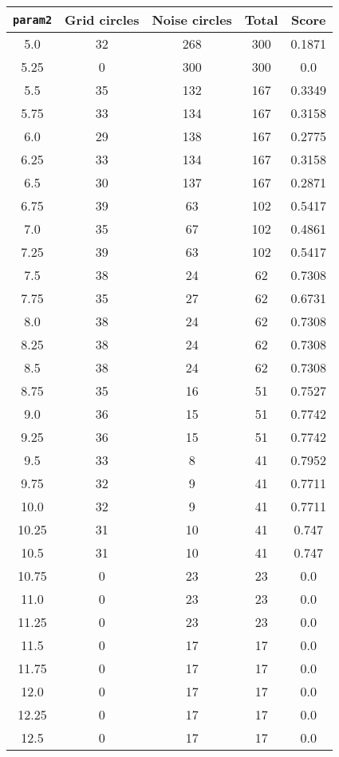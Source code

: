 \documentclass[letterpaper, 12pt]{article}
\begin{document}
\begin{longtable}{|c|c|c|c|c|}
\hline
\textbf{\texttt{param2}} & \textbf{Grid circles} & \textbf{Noise circles} & \textbf{Total} & \textbf{Score} \\
\hline
5.0 & 32 & 268 & 300 & 0.1871 \\
\hline
5.25 & 0 & 300 & 300 & 0.0 \\
\hline
5.5 & 35 & 132 & 167 & 0.3349 \\
\hline
5.75 & 33 & 134 & 167 & 0.3158 \\
\hline
6.0 & 29 & 138 & 167 & 0.2775 \\
\hline
6.25 & 33 & 134 & 167 & 0.3158 \\
\hline
6.5 & 30 & 137 & 167 & 0.2871 \\
\hline
6.75 & 39 & 63 & 102 & 0.5417 \\
\hline
7.0 & 35 & 67 & 102 & 0.4861 \\
\hline
7.25 & 39 & 63 & 102 & 0.5417 \\
\hline
7.5 & 38 & 24 & 62 & 0.7308 \\
\hline
7.75 & 35 & 27 & 62 & 0.6731 \\
\hline
8.0 & 38 & 24 & 62 & 0.7308 \\
\hline
8.25 & 38 & 24 & 62 & 0.7308 \\
\hline
8.5 & 38 & 24 & 62 & 0.7308 \\
\hline
8.75 & 35 & 16 & 51 & 0.7527 \\
\hline
9.0 & 36 & 15 & 51 & 0.7742 \\
\hline
9.25 & 36 & 15 & 51 & 0.7742 \\
\hline
9.5 & 33 & 8 & 41 & 0.7952 \\
\hline
9.75 & 32 & 9 & 41 & 0.7711 \\
\hline
10.0 & 32 & 9 & 41 & 0.7711 \\
\hline
10.25 & 31 & 10 & 41 & 0.747 \\
\hline
10.5 & 31 & 10 & 41 & 0.747 \\
\hline
10.75 & 0 & 23 & 23 & 0.0 \\
\hline
11.0 & 0 & 23 & 23 & 0.0 \\
\hline
11.25 & 0 & 23 & 23 & 0.0 \\
\hline
11.5 & 0 & 17 & 17 & 0.0 \\
\hline
11.75 & 0 & 17 & 17 & 0.0 \\
\hline
12.0 & 0 & 17 & 17 & 0.0 \\
\hline
12.25 & 0 & 17 & 17 & 0.0 \\
\hline
12.5 & 0 & 17 & 17 & 0.0 \\

\end{longtable}
\end{document}
